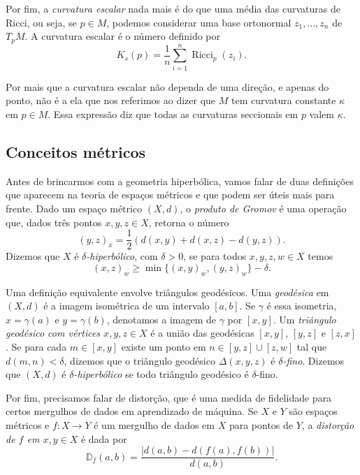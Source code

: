 \documentclass{article}
\DeclareMathOperator{\Ricci}{Ricci}
\begin{document}
Por fim, a \textit{curvatura escalar} nada mais é do que uma média das curvaturas de Ricci, ou seja, se $p \in M$, podemos considerar uma base ortonormal $z_1, \dots, z_n$ de $T_pM$. A curvatura escalar é o número definido por \begin{equation}
    K_s(p) = \frac{1}{n}\sum_{i = 1}^n \Ricci_p(z_i).
\end{equation}

Por mais que a curvatura escalar não dependa de uma direção, e apenas do ponto, não é a ela que nos referimos ao dizer que $M$ tem curvatura constante $\kappa$ em $p \in M$. Essa expressão diz que todas as curvaturas seccionais em $p$ valem $\kappa$.
    
\subsection{Conceitos métricos}

Antes de brincarmos com a geometria hiperbólica, vamos falar de duas definições que aparecem na teoria de espaços métricos e que podem ser úteis mais para frente. Dado um espaço métrico $(X, d)$, o \textit{produto de Gromov} é uma operação que, dados três pontos $x, y, z \in X$, retorna o número \begin{equation}
    (y, z)_x = \frac{1}{2}(d(x,y) + d(x,z) - d(y,z)).
\end{equation} Dizemos que $X$ é \textit{$\delta$-hiperbólico}, com $\delta > 0$, se para todos $x, y, z, w \in X$ temos \begin{equation}
    (x,z)_w \geq \min\{(x,y)_w, (y,z)_w\} - \delta.
\end{equation}

Uma definição equivalente envolve triângulos geodésicos. Uma \textit{geodésica} em $(X, d)$ é a imagem isométrica de um intervalo $[a,b]$. Se $\gamma$ é essa isometria, $x = \gamma(a)$ e $y = \gamma(b)$, denotamos a imagem de $\gamma$ por $[x, y]$. Um \textit{triângulo geodésico com vértices $x, y, z \in X$} é a união das geodésicas $[x,y]$, $[y, z]$ e $[z, x]$. Se para cada $m \in [x,y]$ existe um ponto em $n \in [y,z] \cup [z,w]$ tal que $d(m,n) < \delta$, dizemos que o triângulo geodésico $\Delta(x,y,z)$ é \textit{$\delta$-fino}. Dizemos que $(X, d)$ é \textit{$\delta$-hiperbólico} se todo triângulo geodésico é $\delta$-fino.

Por fim, precisamos falar de distorção, que é uma medida de fidelidade para certos mergulhos de dados em aprendizado de máquina. Se $X$ e $Y$ são espaços métricos e $f \colon X \to Y$ é um mergulho de dados em $X$ para pontos de $Y$, a \textit{distorção de $f$ em $x, y \in X$} é dada por \begin{equation}
    \mathbb{D}_f(a,b) = \frac{|d(a,b) - d(f(a), f(b))|}{d(a,b)}.
\end{equation}
\end{document}
